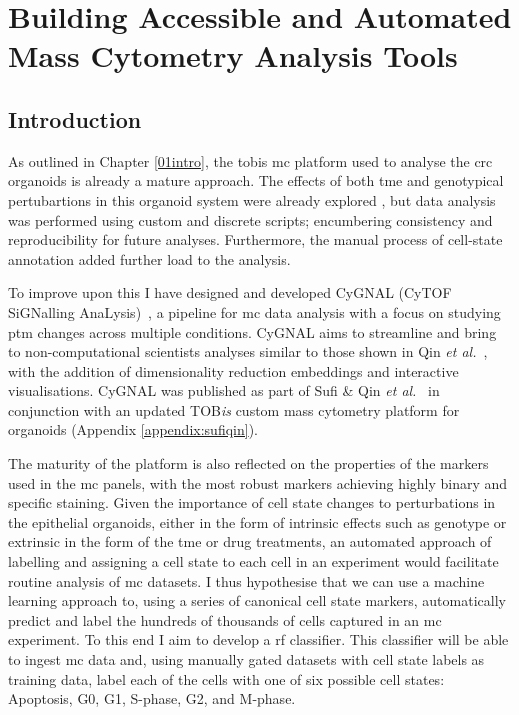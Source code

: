 \chapter{Building Accessible and Automated Mass Cytometry Analysis Tools}
\label{03cytof}

\newpage
\section{Introduction}


As outlined in Chapter \ref{01intro}, the \acrfull{tobis} \acrfull{mc} platform used to analyse the \acrfull{crc} organoids is already a mature approach. The effects of both \acrfull{tme} and genotypical pertubartions in this organoid system were already explored \cite{qin_cell-type-specific_2020}, but data analysis was performed using custom and discrete scripts; encumbering consistency and reproducibility for future analyses. Furthermore, the manual process of cell-state annotation added further load to the analysis.

To improve upon this I have designed and developed CyGNAL (CyTOF SiGNalling AnaLysis)~\cite{ferran_cardoso_tape-labcygnal_2021}, a pipeline for \acrshort{mc} data analysis with a focus on studying \acrfull{ptm} changes across multiple conditions. CyGNAL aims to streamline and bring to non-computational scientists analyses similar to those shown in Qin \emph{et al.}~\cite{qin_cell-type-specific_2020}, with the addition of dimensionality reduction embeddings and interactive visualisations. CyGNAL was published as part of Sufi \& Qin \emph{et al.}~\cite{sufi_multiplexed_2021} in conjunction with an updated TOB\emph{is} custom mass cytometry platform for organoids (Appendix \ref{appendix:sufiqin}).

The maturity of the platform is also reflected on the properties of the markers used in the \acrshort{mc} panels, with the most robust markers achieving highly binary and specific staining. Given the importance of cell state changes to perturbations in the epithelial organoids, either in the form of intrinsic effects such as genotype or extrinsic in the form of the \acrshort{tme} or drug treatments, an automated approach of labelling and assigning a cell state to each cell in an experiment would facilitate routine analysis of \acrshort{mc} datasets. 
I thus hypothesise that we can use a machine learning approach to, using a series of canonical cell state markers, automatically predict and label the hundreds of thousands of cells captured in an \acrshort{mc} experiment. To this end I aim to develop a \acrfull{rf} classifier. This classifier will be able to ingest \acrshort{mc} data and, using manually gated datasets with cell state labels as training data, label each of the cells with one of six possible cell states: Apoptosis, G0, G1, S-phase, G2, and M-phase. 

